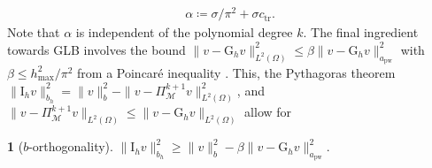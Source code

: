 \documentclass[a4paper]{amsart}
\numberwithin{equation}{section}
\newcommand{\I}{\mathrm{I}}
\newcommand{\pw}{\mathrm{pw}}
\theoremstyle{remark}
\theoremstyle{definition}
\theoremstyle{assumptionnoperiod}
\newtheorem{assumption}{}
\begin{document}
\begin{align*}
	\alpha \coloneqq \sigma/\pi^2 + \sigma c_\mathrm{tr}.
\end{align*}
Note that $\alpha$ is independent of the polynomial degree $k$.
The final ingredient towards GLB involves the bound $\|v - \mathrm{G}_h v\|_{L^2(\Omega)}^2 \leq \beta\|v - \mathrm{G}_h v\|_{a_\pw}^2$ with $\beta \leq h_\mathrm{max}^2/\pi^2$ from a Poincar\'e inequality \cite{Bebendorf2003}.
This, the Pythagoras theorem $\|\I_h v\|^2_{b_h} = \|v\|_b^2 - \|v - \Pi_{\mathcal{M}}^{k+1} v\|_{L^2(\Omega)}^2$, and $\|v - \Pi_{\mathcal{M}}^{k+1} v\|_{L^2(\Omega)} \leq \|v - \mathrm{G}_h v\|_{L^2(\Omega)}$ allow for
\begin{assumption}[$b$-orthogonality]\label{C}
	$\|\I_h v\|_{b_h}^2 \geq \|v\|_b^2 - \beta \|v - \mathrm{G}_h v\|_{a_\pw}^2$.
\end{assumption}
\end{document}
